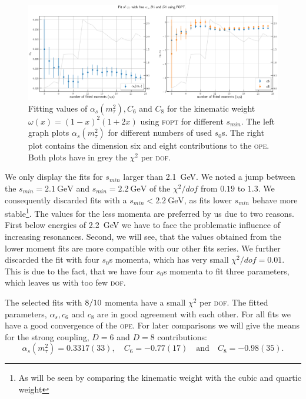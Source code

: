 \documentclass[../../index.tex]{subfiles}
\begin{document}
\begin{figure}
  \centering \includegraphics[width=\textwidth]{./images/fitWKinAlD6D8.eps}
  \caption{Fitting values of \(\alpha_s(m_\tau^2), C_6\) and \(C_8\) for the
    kinematic weight \(\omega(x)=(1-x)^2(1+2x)\) using \textsc{fopt} for
    different \(s_{min}\). The left graph plots \(\alpha_s(m_\tau^2)\) for
    different numbers of used \(s_0\)s. The right plot contains the dimension
    six and eight contributions to the \textsc{ope}. Both plots have in grey the
    \(\chi^2\) per \textsc{dof}.}
  \label{fig:fitWKinAlD6D8}
\end{figure}

We only display the fits for \(s_{min}\) larger than \SI{2.1}{\giga\eV}. We
noted a jump between the \(s_{min}=\SI{2.1}{\giga\eV}\) and
\(s_{min}=\SI{2.2}{\giga\eV}\) of the \(\chi^2/dof\) from \(0.19\) to \(1.3\).
We consequently discarded fits with a \(s_{min}<\SI{2.2}{\giga\eV}\), as fits
lower \(s_{min}\) behave more stable\footnote{As will be seen by comparing the
  kinematic weight with the cubic and quartic weight}. The values for the less
momenta are preferred by us due to two reasons. First below energies of
\SI{2.2}{\giga\eV} we have to face the problematic influence of increasing
resonances. Second, we will see, that the values obtained from the lower moment
fits are more compatible with our other fits series. We further discarded the
fit with four \(s_0\)s momenta, which has very small \(\chi^2/dof=0.01\). This
is due to the fact, that we have four \(s_0\)s momenta to fit three parameters,
which leaves us with too few \textsc{dof}.

The selected fits with \(8\-/10\) momenta have a small \(\chi^2\) per
\textsc{dof}. The fitted parameters, \(\alpha_s, c_6\) and \(c_8\) are in good
agreement with each other. For all fits we have a good convergence of the
\textsc{ope}. For later comparisons we will give the means for the strong
coupling, \(D=6\) and \(D=8\) contributions:
\begin{equation}
  \label{eq:wKinResult}
  \alpha_s(m_\tau^2) = 0.3317(33), \quad C_6 = -0.77(17) \quad \text{and} \quad
  C_8 = -0.98(35).
\end{equation}
\end{document}
